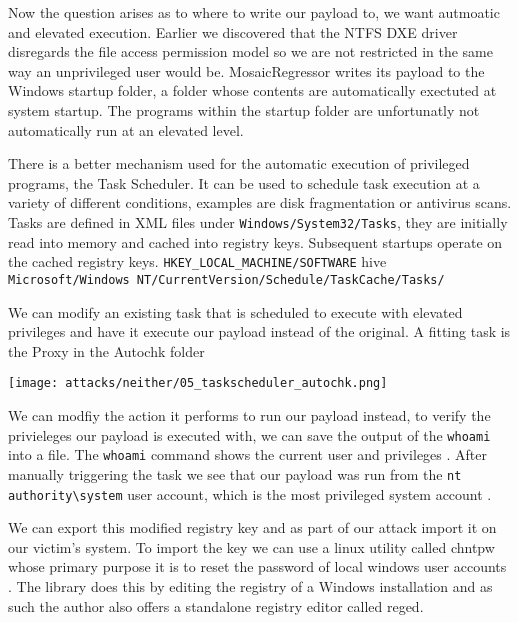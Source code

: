 Now the question arises as to where to write our payload to, we want autmoatic and elevated execution. Earlier we discovered that the NTFS DXE driver disregards the file access permission model so we are not restricted in the same way an unprivileged user would be. MosaicRegressor writes its payload to the Windows startup folder, a folder whose contents are automatically exectuted at system startup. The programs within the startup folder are unfortunatly not automatically run at an elevated level.



There is a better mechanism used for the automatic execution of privileged programs, the Task Scheduler. It can be used to schedule task execution at a variety of different conditions, examples are disk fragmentation or antivirus scans.
Tasks are defined in XML files under \lstinline{Windows/System32/Tasks}, they are initially read into memory and cached into registry keys. Subsequent startups operate on the cached registry keys.
\lstinline{HKEY_LOCAL_MACHINE/SOFTWARE} hive
\lstinline{Microsoft/Windows NT/CurrentVersion/Schedule/TaskCache/Tasks/}

\cite{windows-internals-7-part2}

We can modify an existing task that is scheduled to execute with elevated privileges and have it execute our payload instead of the original. A fitting task is the Proxy in the Autochk folder

\texttt{[image: attacks/neither/05\_taskscheduler\_autochk.png]}

We can modfiy the action it performs to run our payload instead, to verify the privieleges our payload is executed with, we can save the output of the \lstinline{whoami} into a file. The \lstinline{whoami} command shows the current user and privileges \cite{windows-whoami}. After manually triggering the task we see that our payload was run from the \lstinline{nt authority\system} user account, which is the most privileged system account \cite{microsoft-localsystem-account}.

We can export this modified registry key and as part of our attack import it on our victim's system. To import the key we can use a linux utility called chntpw whose primary purpose it is to reset the password of local windows user accounts \cite{chntpw}. The library does this by editing the registry of a Windows installation and as such the author also offers a standalone registry editor called reged.

